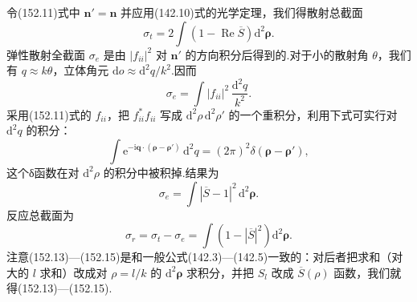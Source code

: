 令(152.11)式中 $\boldsymbol{n}'=\boldsymbol{n}$ 并应用(142.10)式的光学定理，我们得散射总截面
\begin{equation}
  \sigma_t=2\int\left(1-\operatorname{Re}\overline{S}\right)\mathrm{d}^2\boldsymbol{\rho}.
\end{equation}
弹性散射全截面 $\sigma_e$ 是由 $|f_{ii}|^2$ 对 $\boldsymbol{n}'$ 的方向积分后得到的.对于小的散射角 $\theta$，我们有 $q\approx k\theta$，立体角元 $\mathrm{d}o\approx\mathrm{d}^2q/k^2$.因而
\begin{equation*}
  \sigma_e=\int|f_{ii}|^2\,\frac{\mathrm{d}^2q}{k^2}.
\end{equation*}
采用(152.11)式的 $f_{ii}$，把 $f_{ii}^{*}f_{ii}$ 写成 $\mathrm{d}^2\rho\,\mathrm{d}^2\rho'$ 的一个重积分，利用下式可实行对 $\mathrm{d}^2q$ 的积分：
\begin{equation*}
  \int\mathrm{e}^{-\mathrm{i}\boldsymbol{q}\cdot(\boldsymbol{\rho}-\boldsymbol{\rho}')}\,\mathrm{d}^2q
  =(2\pi)^2\delta(\boldsymbol{\rho}-\boldsymbol{\rho}'),
\end{equation*}
这个δ函数在对 $\mathrm{d}^2\rho$ 的积分中被积掉.结果为
\begin{equation}
  \sigma_e=\int|\overline{S}-1|^2\,\mathrm{d}^2\boldsymbol{\rho}.
\end{equation}
反应总截面为
\begin{equation}
  \sigma_r=\sigma_t-\sigma_e=\int\left(1-|\overline{S}|^2\right)\mathrm{d}^2\boldsymbol{\rho}.
\end{equation}
注意(152.13)—(152.15)是和一般公式(142.3)—(142.5)一致的：对后者把求和（对大的 $l$ 求和）改成对 $\rho=l/k$ 的 $\mathrm{d}^2\boldsymbol{\rho}$ 求积分，并把 $S_l$ 改成 $\overline{S}(\rho)$ 函数，我们就得(152.13)—(152.15).

